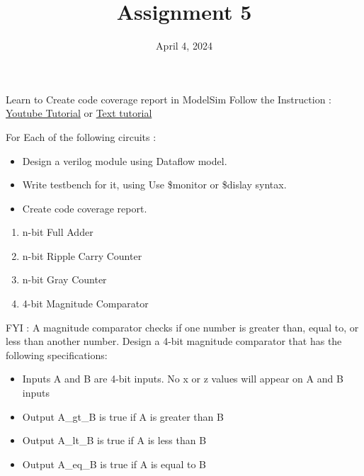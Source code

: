 \documentclass{vhdl-assignment}
\title{Assignment 5}
\date{April 4, 2024}
\begin{document}
\maketitle
\thispagestyle{fancy}

\begin{problem}{Learn to Create code coverage report in ModelSim}
    Follow the Instruction : \href{https://youtu.be/vkzd5ckQ5ZQ}{Youtube Tutorial}
    or
    \href{https://github.com/canh25xp/VHDL_Weekly_Assignment/wiki/Code-Coverage-Report-Tutorial}{Text tutorial}

\end{problem}

\begin{problem}{}
    For Each of the following circuits :
    \begin{itemize}
        \item Design a verilog module using Dataflow model.
        \item Write testbench for it, using Use \$monitor or \$dislay syntax.
        \item Create code coverage report.
    \end{itemize}

    \begin{enumerate}
        \item n-bit Full Adder
        \item n-bit Ripple Carry Counter
        \item n-bit Gray Counter
        \item 4-bit Magnitude Comparator
    \end{enumerate}

FYI : A magnitude comparator checks if one number is greater than, equal to, or less than
another number. Design a 4-bit magnitude comparator that has the following
specifications:

\begin{itemize}
    \item Inputs A and B are 4-bit inputs. No x or z values will appear on A and B inputs
    \item Output A\_gt\_B is true if A is greater than B
    \item Output A\_lt\_B is true if A is less than B
    \item Output A\_eq\_B is true if A is equal to B
\end{itemize}

\end{problem}
\end{document}
